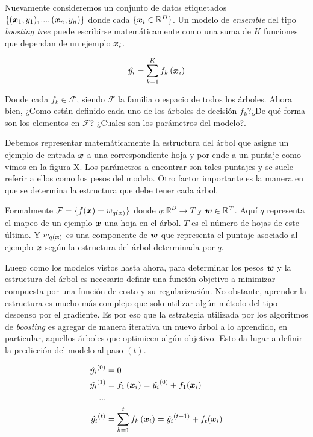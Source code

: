 Nuevamente consideremos un conjunto de datos etiquetados $\{(\boldsymbol{x}_1, y_1),
..., (\boldsymbol{x}_n, y_n)\}$ donde cada $\{\boldsymbol{x}_i \in \mathbb{R}^{D}\}$. Un
modelo de \emph{ensemble} del tipo \emph{boosting tree} puede escribirse
matemáticamente como una suma de $K$ funciones que dependan de un ejemplo
$\boldsymbol{x}_i$.

\begin{equation} \label{eq:xgb-model-1}
    \hat{y_{i}} = \sum_{k=1}^{K} f_{k} \left( \boldsymbol{x}_{i}\right)
\end{equation}

Donde cada $f_k \in \mathcal{F}$, siendo $\mathcal{F}$ la familia o espacio de todos los árboles. Ahora bien, ¿Como están definido cada uno de
los árboles de decisión $f_k$?¿De qué forma son los elementos en $\mathcal{F}$?
¿Cuales son los parámetros del modelo?.

Debemos representar matemáticamente la
estructura del árbol que asigne un ejemplo de entrada $\boldsymbol{x}$ a una
correspondiente hoja y por ende a un puntaje como vimos en la figura X. Los
parámetros a encontrar son tales puntajes y se suele referir a ellos como los
pesos del modelo. Otro factor importante es la manera en que se determina la
estructura que debe tener cada árbol.

Formalmente $\mathcal{F} = \{f(\boldsymbol{x}) = w_{q\left( \boldsymbol{x} \right)}\}$ donde
$q : \mathbb{R}^{D} \rightarrow T$ y $\boldsymbol{w} \in \mathbb{R}^{T}$. Aquí $q$
representa el mapeo de un ejemplo $\boldsymbol{x}$ una hoja en el árbol. $T$ es el
número de hojas de este último. Y $w_{q\left( \boldsymbol{x} \right)}$ es una
componente de $\boldsymbol{w}$ que representa el puntaje asociado al ejemplo
$\boldsymbol{x}$ según la estructura del árbol determinada por $q$.

Luego como los modelos vistos hasta ahora, para determinar los pesos $\boldsymbol{w}$
y la estructura del árbol es necesario definir una función objetivo a minimizar
compuesta por una función de costo y su regularización. No obstante, aprender la
estructura es mucho más complejo que solo utilizar algún método del tipo
descenso por el gradiente. Es por eso que la estrategia utilizada por los
algoritmos de \emph{boosting} es agregar de manera iterativa un nuevo árbol a lo
aprendido, en particular, aquellos árboles que optimicen algún objetivo. Esto da
lugar a definir la predicción del modelo al paso $(t)$.

\begin{align*}
    \hat{y_i}^{(0)} &= 0 \\
    \hat{y_i}^{(1)} &= f_{1}\left( \boldsymbol{x}_i \right) = \hat{y_i}^{(0)} + f_1{(\boldsymbol{x}_i)} \\
    ... \\
    \hat{y_i}^{(t)} &= \sum_{k=1}^{t} f_{k} \left( \boldsymbol{x}_{i}\right) = \hat{y_i}^{(t - 1)} + f_t{(\boldsymbol{x}_i)}
\end{align*}

